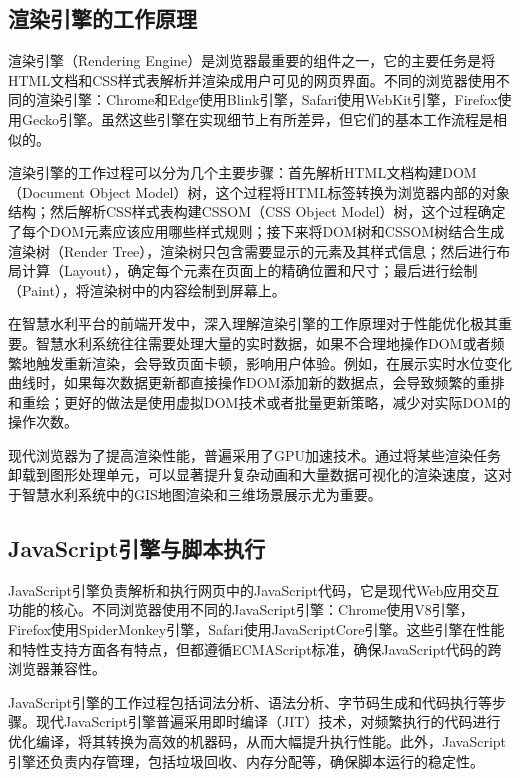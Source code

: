 \hypertarget{ux6e32ux67d3ux5f15ux64ceux7684ux5de5ux4f5cux539fux7406}{%
\subsection{渲染引擎的工作原理}\label{ux6e32ux67d3ux5f15ux64ceux7684ux5de5ux4f5cux539fux7406}}

渲染引擎（Rendering Engine）是浏览器最重要的组件之一，它的主要任务是将HTML文档和CSS样式表解析并渲染成用户可见的网页界面。不同的浏览器使用不同的渲染引擎：Chrome和Edge使用Blink引擎，Safari使用WebKit引擎，Firefox使用Gecko引擎。虽然这些引擎在实现细节上有所差异，但它们的基本工作流程是相似的。

渲染引擎的工作过程可以分为几个主要步骤：首先解析HTML文档构建DOM（Document Object Model）树，这个过程将HTML标签转换为浏览器内部的对象结构；然后解析CSS样式表构建CSSOM（CSS Object Model）树，这个过程确定了每个DOM元素应该应用哪些样式规则；接下来将DOM树和CSSOM树结合生成渲染树（Render Tree），渲染树只包含需要显示的元素及其样式信息；然后进行布局计算（Layout），确定每个元素在页面上的精确位置和尺寸；最后进行绘制（Paint），将渲染树中的内容绘制到屏幕上。

在智慧水利平台的前端开发中，深入理解渲染引擎的工作原理对于性能优化极其重要。智慧水利系统往往需要处理大量的实时数据，如果不合理地操作DOM或者频繁地触发重新渲染，会导致页面卡顿，影响用户体验。例如，在展示实时水位变化曲线时，如果每次数据更新都直接操作DOM添加新的数据点，会导致频繁的重排和重绘；更好的做法是使用虚拟DOM技术或者批量更新策略，减少对实际DOM的操作次数。

 现代浏览器为了提高渲染性能，普遍采用了GPU加速技术。通过将某些渲染任务卸载到图形处理单元，可以显著提升复杂动画和大量数据可视化的渲染速度，这对于智慧水利系统中的GIS地图渲染和三维场景展示尤为重要。

\hypertarget{javascriptux5f15ux64ceux4e0eux811aux672cux6267ux884c}{%
\subsection{JavaScript引擎与脚本执行}\label{javascriptux5f15ux64ceux4e0eux811aux672cux6267ux884c}}

JavaScript引擎负责解析和执行网页中的JavaScript代码，它是现代Web应用交互功能的核心。不同浏览器使用不同的JavaScript引擎：Chrome使用V8引擎，Firefox使用SpiderMonkey引擎，Safari使用JavaScriptCore引擎。这些引擎在性能和特性支持方面各有特点，但都遵循ECMAScript标准，确保JavaScript代码的跨浏览器兼容性。

JavaScript引擎的工作过程包括词法分析、语法分析、字节码生成和代码执行等步骤。现代JavaScript引擎普遍采用即时编译（JIT）技术，对频繁执行的代码进行优化编译，将其转换为高效的机器码，从而大幅提升执行性能。此外，JavaScript引擎还负责内存管理，包括垃圾回收、内存分配等，确保脚本运行的稳定性。

